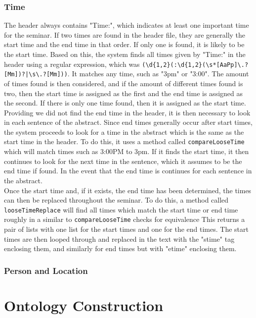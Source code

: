 \documentclass[10pt]{article}
\begin{document}
\begin{multicols}{2}
\subsubsection{Time}
The header always contains "Time:", which indicates at least one important time for the seminar. If two times are found in the header file, they are generally the start time and the end time in that order. If only one is found, it is likely to be the start time. Based on this, the system finds all times given by "Time:" in the header using a regular expression, which was {{\tt (\textbackslash d\{1,2\}(:\textbackslash d\{1,2\}(\textbackslash s*[AaPp]\textbackslash .?[Mm])?|\textbackslash s\linebreak*[AaPp]\textbackslash .?[Mm]))}}. It matches any time, such as "3pm" or "3:00". The amount of times found is then considered, and if the amount of different times found is two, then the start time is assigned as the first and the end time is assigned as the second. If there is only one time found, then it is assigned as the start time.\\
Providing we did not find the end time in the header, it is then necessary to look in each sentence of the abstract. Since end times generally occur after start times, the system proceeds to look for a time in the abstract which is the same as the start time in the header. To do this, it uses a method called {{\tt compareLooseTime}} which will match times such as 3:00PM to 3pm. If it finds the start time, it then continues to look for the next time in the sentence, which it assumes to be the end time if found. In the event that the end time is continues for each sentence in the abstract.\\
Once the start time and, if it exists, the end time has been determined, the times can then be replaced throughout the seminar. To do this, a method called {{\tt looseTimeReplace}} will find all times which match the start time or end time roughly in a similar to {{\tt compareLooseTime}} checks for equivalence This returns a pair of lists with one list for the start times and one for the end times. The start times are then looped through and replaced in the text with the "stime" tag enclosing them, and similarly for end times but with "etime" enclosing them.
\subsubsection{Person and Location}

\section{Ontology Construction}


\end{multicols}
\end{document}
